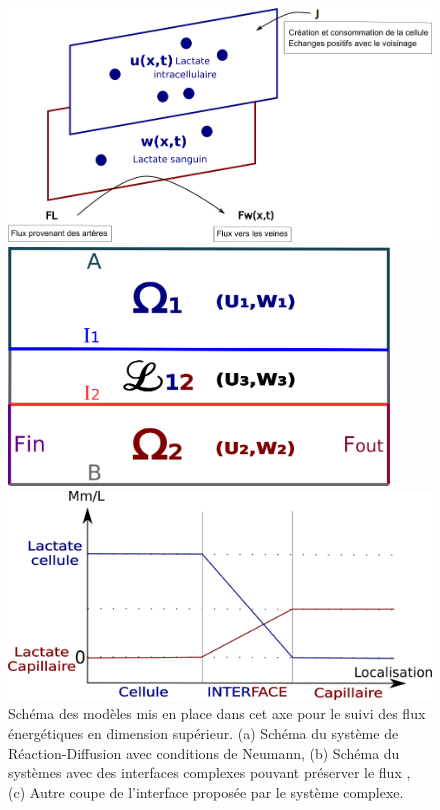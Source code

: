 \documentclass[a4paper, 12pt, twoside, openright]{article}
\begin{document}
\begin{itemize}
\begin{figure}[!htbp]
\centering
\begin{minipage}{0.33\textwidth}
  \centering
\includegraphics[width=1\textwidth]{dessinD.png}
\end{minipage}
\begin{minipage}{0.33\textwidth}
  \centering
\includegraphics[width=0.9\textwidth]{dessinD2.png}
\end{minipage}
\begin{minipage}{0.33\textwidth}
\centering
\includegraphics[width=1\textwidth]{dessinD3.png}
\end{minipage}
\caption{Schéma des modèles mis en place dans cet axe pour le suivi des flux énergétiques en dimension supérieur. (a) Schéma du système de Réaction-Diffusion avec conditions de Neumann, (b) Schéma du systèmes avec des interfaces complexes pouvant préserver le flux , (c) Autre coupe de l'interface proposée par le système complexe. }\label{Lac2}
\end{figure}


\end{itemize}
\end{document}
